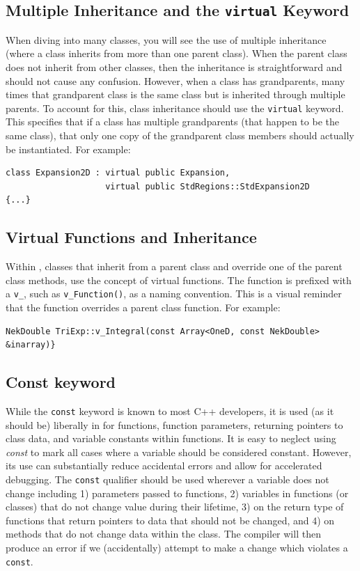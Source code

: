 \subsection{Multiple Inheritance and the \lstinline{virtual} Keyword}
When diving into many {\nek} classes, you will see the use of multiple
inheritance (where a class inherits from more than one parent
class).  When the parent class does not inherit from other classes,
then the inheritance is straightforward and should not cause any
confusion.  However, when a class has grandparents, many times that
grandparent class is the same class but is inherited through multiple
parents.  To account for this, class inheritance should use the
\lstinline{virtual} keyword.  This specifies that if a class has multiple
grandparents (that happen to be the same class), that only one copy of
the grandparent class members should actually be instantiated. For example:
\begin{lstlisting}
class Expansion2D : virtual public Expansion,
                    virtual public StdRegions::StdExpansion2D
{...}
\end{lstlisting}


\subsection{Virtual Functions and Inheritance}
Within {\nek}, classes
that inherit from a parent class and override one of the parent
class methods, use the concept of virtual functions. The function is prefixed with a \lstinline{v_}, such as \lstinline{v_Function()}, as a naming convention.  This is a visual reminder that the function overrides a parent class function. For example:
\begin{lstlisting}
NekDouble TriExp::v_Integral(const Array<OneD, const NekDouble> &inarray)}
\end{lstlisting}

\subsection{Const keyword}
While the \lstinline{const} keyword is known to most C++
developers, it is used (as it should be) liberally in {\nek} for functions,
function parameters, returning pointers to class data, and variable
constants within functions.  It is easy to neglect using \emph{const}
to mark all cases where a variable should be considered constant.
However, its use can substantially reduce accidental errors and
allow for accelerated debugging. The \lstinline{const} qualifier should be used wherever a variable does not change including 1) parameters passed to
functions, 2) variables in functions (or classes) that do not change
value during their lifetime, 3) on the return type of functions that return pointers to data that should not be changed, and 4) on methods that do not
change data within the class. The compiler will then produce an error if we (accidentally) attempt to make a change which violates a \lstinline{const}.

